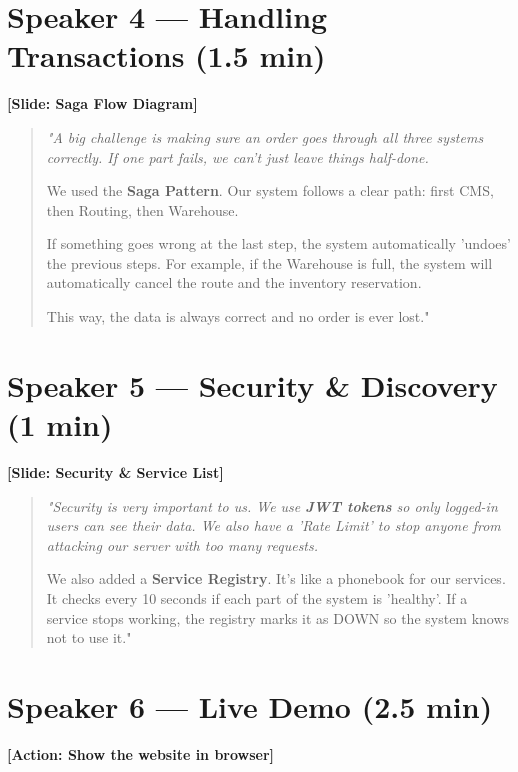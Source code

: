 \documentclass[12pt,a4paper]{article}
\newenvironment{scriptquote}
{\begin{quote}\itshape\color{navy!90}}
{\end{quote}}
\newcommand{\slideinfo}[1]{\noindent\textbf{\color{teal}[#1]}\medskip}
\begin{document}
\section{Speaker 4 --- Handling Transactions (1.5 min)}

\slideinfo{Slide: Saga Flow Diagram}

\begin{scriptquote}
"A big challenge is making sure an order goes through all three systems correctly. If one part fails, we can't just leave things half-done.

We used the \textbf{Saga Pattern}. Our system follows a clear path: first CMS, then Routing, then Warehouse.

If something goes wrong at the last step, the system automatically 'undoes' the previous steps. For example, if the Warehouse is full, the system will automatically cancel the route and the inventory reservation.

This way, the data is always correct and no order is ever lost."
\end{scriptquote}

\section{Speaker 5 --- Security \& Discovery (1 min)}

\slideinfo{Slide: Security \& Service List}

\begin{scriptquote}
"Security is very important to us. We use \textbf{JWT tokens} so only logged-in users can see their data. We also have a 'Rate Limit' to stop anyone from attacking our server with too many requests.

We also added a \textbf{Service Registry}. It’s like a phonebook for our services. It checks every 10 seconds if each part of the system is 'healthy'. If a service stops working, the registry marks it as DOWN so the system knows not to use it."
\end{scriptquote}

\section{Speaker 6 --- Live Demo (2.5 min)}

\slideinfo{Action: Show the website in browser}
\end{document}

